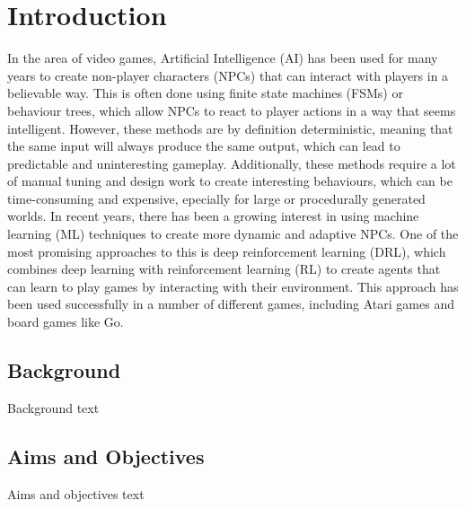 \chapter{Introduction}

In the area of video games, Artificial Intelligence (AI) has been used for many years to create non-player characters (NPCs) that can interact with players in a believable way.
This is often done using finite state machines (FSMs) or behaviour trees, which allow NPCs to react to player actions in a way that seems intelligent. 
However, these methods are by definition deterministic, meaning that the same input will always produce the same output, which can lead to predictable and uninteresting gameplay.
Additionally, these methods require a lot of manual tuning and design work to create interesting behaviours, which can be time-consuming and expensive, epecially for large or procedurally generated worlds.
In recent years, there has been a growing interest in using machine learning (ML) techniques to create more dynamic and adaptive NPCs.
One of the most promising approaches to this is deep reinforcement learning (DRL), which combines deep learning with reinforcement learning (RL) to create agents that can learn to play games by interacting with their environment.
This approach has been used successfully in a number of different games, including Atari games and board games like Go.

\section{Background}

Background text

\section{Aims and Objectives}

Aims and objectives text

